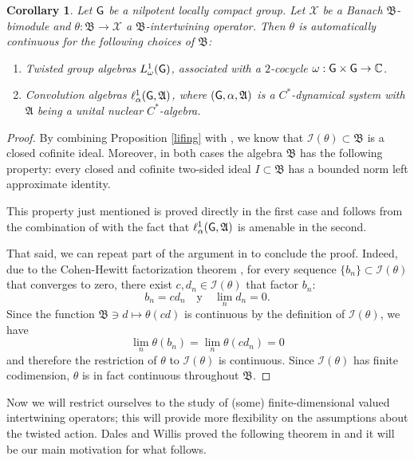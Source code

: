 \documentclass[11pt]{article}
\newcommand{\A}{\mathfrak{A}}
\newcommand{\B}{\mathfrak{B}}
\newcommand{\CC}{\mathbb{C}}
\def\X{\mathcal{X}}
\def\G{{\sf G}}
\newtheorem{cor}[thm]{Corollary}
\theoremstyle{definition}
\theoremstyle{remark}
\numberwithin{equation}{section}
\numberwithin{equation}{section}
\begin{document}
\begin{cor}\label{ext}
    Let $\G$ be a nilpotent locally compact group. Let $\X$ be a Banach $\B$-bimodule and $\theta:\B\to\X$ a $\B$-intertwining operator. Then $\theta$ is automatically continuous for the following choices of $\B$: \begin{enumerate}
        \item[(i)] Twisted group algebras $L^1_\omega(\G)$, associated with a $2$-cocycle $\omega:\G\times \G\to \CC$.
        \item[(ii)] Convolution algebras $\ell^1_\alpha(\G,\A)$, where $(\G,\alpha,\A)$ is a $C^*$-dynamical system with $\A$ being a unital nuclear $C^*$-algebra.
        \end{enumerate}
\end{cor}
\begin{proof}
    By combining Proposition \ref{lifing} with \cite[Corollary 4.21]{flores2024}, we know that $\mathscr I(\theta)\subset \B$ is a closed cofinite ideal. Moreover, in both cases the algebra $\B$ has the following property: every closed and cofinite two-sided ideal $I\subset\B$ has a bounded norm left approximate identity.

This property just mentioned is proved directly in the first case \cite[Theorem A.3]{flores2024} and follows from the combination of \cite[Proposition VII.2.31]{He89} with the fact that $\ell^1_\alpha(\G,\A)$ is amenable \cite[Proposition IV.4.2]{Je99} in the second.

That said, we can repeat part of the argument in \cite[Theorem 3.6]{flores2024} to conclude the proof. Indeed, due to the Cohen-Hewitt factorization theorem \cite[Corollary 11.12]{BD73}, for every sequence $\{b_n\}\subset\mathscr I(\theta)$ that converges to zero, there exist $c, d_n\in\mathscr I(\theta)$ that factor $b_n$: 
$$
b_n=cd_n\quad\text{y}\quad \lim_{n} d_n=0.
$$ 
Since the function $\B\ni d\mapsto \theta(cd)$ is continuous by the definition of $\mathscr I(\theta)$, we have 
$$
\lim_n\theta(b_n)=\lim_n\theta(cd_n)=0
$$ 
and therefore the restriction of $\theta$ to $\mathscr I(\theta)$ is continuous. Since $\mathscr I(\theta)$ has finite codimension, $\theta$ is in fact continuous throughout $\B$.
\end{proof}


Now we will restrict ourselves to the study of (some) finite-dimensional valued intertwining operators; this will provide more flexibility on the assumptions about the twisted action. Dales and Willis proved the following theorem in \cite[Theorem 2.5]{DaWi83} and it will be our main motivation for what follows.
\end{document}

